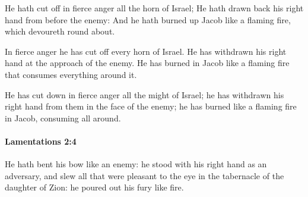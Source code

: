 			\begin{versebox}
					\item[BHS] 
					\item[LXX] 
					\item[ASV] He hath cut off in fierce anger all the horn of Israel; He hath drawn back his right hand from before the enemy: And he hath burned up Jacob like a flaming fire, which devoureth round about.
					\item[NIV] In fierce anger he has cut off every horn of Israel. He has withdrawn his right hand at the approach of the enemy. He has burned in Jacob like a flaming fire that consumes everything around it.
					\item[NRSV] He has cut down in fierce anger all the might of Israel; he has withdrawn his right hand from them in the face of the enemy; he has burned like a flaming fire in Jacob, consuming all around.
			\end{versebox}

		\paragraph{Lamentations 2:4} %
			\label{LAMENTATIONS-2-4}

			He hath bent his bow like an enemy: he stood with his right hand as an adversary, and slew all that were pleasant to the eye in the tabernacle of the daughter of Zion: he poured out his fury like fire.

